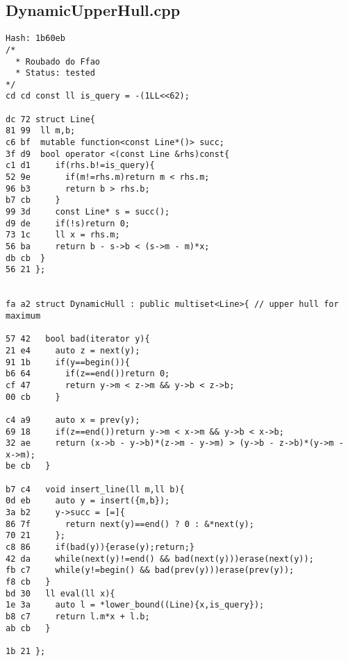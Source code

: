 \documentclass[11pt, a4paper, twoside]{article}
\begin{document}
\subsection{DynamicUpperHull.cpp}
\begin{lstlisting}
Hash: 1b60eb
/*
  * Roubado do Ffao
  * Status: tested
*/
cd cd const ll is_query = -(1LL<<62);

dc 72 struct Line{
81 99  ll m,b;
c6 bf  mutable function<const Line*()> succ;
3f d9  bool operator <(const Line &rhs)const{
c1 d1     if(rhs.b!=is_query){
52 9e       if(m!=rhs.m)return m < rhs.m;
96 b3       return b > rhs.b;
b7 cb     }
99 3d     const Line* s = succ();
d9 de     if(!s)return 0;
73 1c     ll x = rhs.m;
56 ba     return b - s->b < (s->m - m)*x;
db cb  }
56 21 };


fa a2 struct DynamicHull : public multiset<Line>{ // upper hull for maximum
      
57 42   bool bad(iterator y){
21 e4     auto z = next(y);
91 1b     if(y==begin()){
b6 64       if(z==end())return 0;
cf 47       return y->m < z->m && y->b < z->b;
00 cb     }
      
c4 a9     auto x = prev(y);
69 18     if(z==end())return y->m < x->m && y->b < x->b;
32 ae     return (x->b - y->b)*(z->m - y->m) > (y->b - z->b)*(y->m - x->m);
be cb   }
      
b7 c4   void insert_line(ll m,ll b){
0d eb     auto y = insert({m,b});
3a b2     y->succ = [=]{
86 7f       return next(y)==end() ? 0 : &*next(y);
70 21     };
c8 86     if(bad(y)){erase(y);return;}
42 da     while(next(y)!=end() && bad(next(y)))erase(next(y));
fb c7     while(y!=begin() && bad(prev(y)))erase(prev(y));
f8 cb   }
bd 30   ll eval(ll x){
1e 3a     auto l = *lower_bound((Line){x,is_query});
b8 c7     return l.m*x + l.b;
ab cb   }
      
1b 21 };
\end{lstlisting}
\end{document}
